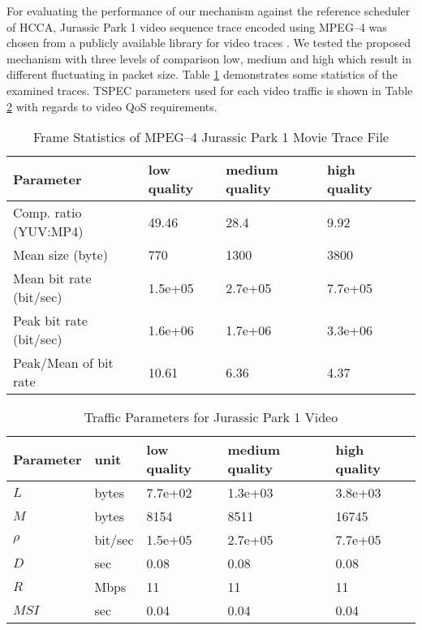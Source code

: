\documentclass[a4paper, conference]{IEEEtran}
\begin{document}
For evaluating the performance of our mechanism against the reference scheduler of HCCA, Jurassic Park 1 video sequence trace encoded using MPEG--4 was chosen from a publicly available library for video traces \cite{Fitzek2001}. We tested the proposed mechanism with three levels of comparison low, medium and high which result in different fluctuating in packet size. Table \ref{tab:traceStats} demonstrates some statistics of the examined traces. TSPEC parameters used for each video traffic is shown in Table \ref{tab:VideoParas} with regards to video QoS requirements.
\begin{table}
\centering
\caption {Frame Statistics of MPEG--4 Jurassic Park 1 Movie Trace File}
    \begin{tabular}{lllll}
\hline
Parameter				& low quality	& medium quality& high quality	\\
\hline
Comp. ratio (YUV:MP4)	& 49.46			& 28.4			& 9.92			\\
Mean size (byte)		& 770			& 1300			& 3800			\\
Mean bit rate (bit/sec)	& 1.5e+05		& 2.7e+05		& 7.7e+05		\\
Peak bit rate (bit/sec)	& 1.6e+06		& 1.7e+06		& 3.3e+06		\\
Peak/Mean of bit rate	& 10.61			& 6.36			& 4.37			\\ \hline 
\end{tabular}
\label{tab:traceStats}
\end{table}
\begin{table}
\centering
\caption {Traffic Parameters for Jurassic Park 1 Video}
\begin{tabular}[width=\linewidth]{lllll}
    \hline
    Parameter	& unit		& low quality	& medium quality	& high quality	\\ \hline
    $L$			& bytes		& 7.7e+02		& 1.3e+03			& 3.8e+03 		\\
    $M$			& bytes		& 8154			& 8511				& 16745 		\\
    $\rho$		& bit/sec	& 1.5e+05		& 2.7e+05			& 7.7e+05		\\
    $D$			& sec		& 0.08			& 0.08				& 0.08			\\
    $R$			& Mbps		& 11			& 11				& 11			\\
    $MSI$		& sec		& 0.04			& 0.04				& 0.04			\\ \hline
    \end{tabular}
\label{tab:VideoParas}
\end{table}
\end{document}
